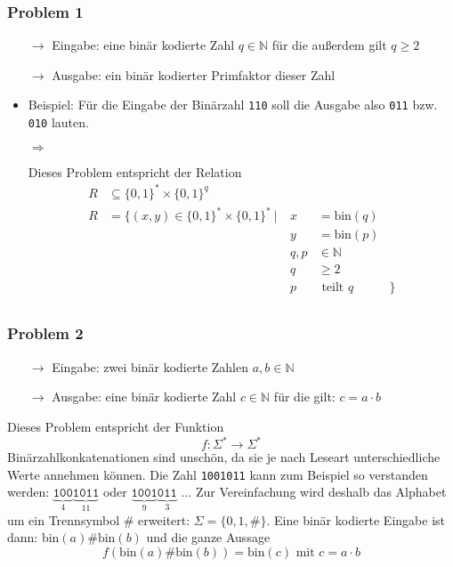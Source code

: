 \documentclass{scrartcl}%
\begin{document}
    \subsubsection*{Problem 1}
    \begin{itemize}
        \item [$\rightarrow$] Eingabe: eine binär kodierte Zahl $q \in \mathbb{N}$ für die außerdem gilt $q \geq 2$
        \item [$\rightarrow$] Ausgabe: ein binär kodierter Primfaktor dieser Zahl
        \item Beispiel: Für die Eingabe der Binärzahl \texttt{110} soll die Ausgabe also \texttt{011} bzw. \texttt{010} lauten.
        \item [$\Rightarrow$]{
        Dieses Problem entspricht der Relation
        \begin{equation*}
            \begin{align*}
                R & \subseteq \{0,1\}^*\times\{0,1\}^q \\
                R & = \{ (x,y) \in \{0,1\}^* \times \{0,1\}^* \ | \ & x&=\text{bin}(q)  \\
                && y &=\text{bin}(p) \\
                && q,p& \in \mathbb{N} \\
                && q& \geq 2 \\
                && p& \text{ teilt } q &\} \\
            \end{align*}
        \end{equation*}

        }
    \end{itemize}

    \subsubsection*{Problem 2}
    \begin{itemize}
        \item [$\rightarrow$] Eingabe: zwei binär kodierte Zahlen $a,b \in \mathbb{N}$
        \item [$\rightarrow$] Ausgabe: eine binär kodierte Zahl $c \in \mathbb{N}$ für die gilt: $c=a \cdot b$
    \end{itemize}
    Dieses Problem entspricht der Funktion
    \begin{equation*}
        \displaystyle f: \Sigma^* \rightarrow \Sigma^*
    \end{equation*}
    Binärzahlkonkatenationen sind unschön, da sie je nach Leseart unterschiedliche Werte annehmen können.
    Die Zahl \texttt{1001011} kann zum Beispiel so verstanden werden:
    $\underbrace{\texttt{100}}_{4}\underbrace{\texttt{1011}}_{11}$ oder $\underbrace{\texttt{1001}}_{9}\underbrace{\texttt{011}}_{3}$ ...
    Zur Vereinfachung wird deshalb das Alphabet um ein Trennsymbol \# erweitert: $\Sigma = \{0,1,\#\}$.
    Eine binär kodierte Eingabe ist dann: bin$(a)\#\text{bin}(b)$ und die ganze Aussage
    \begin{equation*}
        f(\text{bin}(a)\#\text{bin}(b)) = \text{bin}(c) \text{ mit } c=a\cdot b
    \end{equation*}
\end{document}
